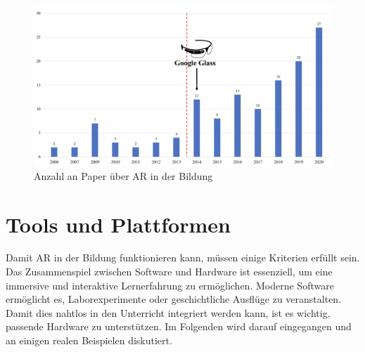 \documentclass[conference]{IEEEtran}
\begin{document}
\begin{figure}[htbp]
    \centerline{\includegraphics[scale=0.2]{img/entwicklung.png}}
    \caption{Anzahl an Paper über AR in der Bildung}
    \label{fig1}
\end{figure}

\section{Tools und Plattformen}\label{AA}
Damit AR in der Bildung funktionieren kann, müssen einige Kriterien erfüllt sein. Das Zusammenspiel
zwischen Software und Hardware ist essenziell, um eine immersive und interaktive Lernerfahrung
zu ermöglichen. Moderne Software ermöglicht es, Laborexperimente oder geschichtliche Ausflüge
zu veranstalten. Damit dies nahtlos in den Unterricht integriert werden kann, ist es wichtig, passende Hardware zu unterstützen.
Im Folgenden wird darauf eingegangen und an einigen realen Beispielen diskutiert.
\end{document}
